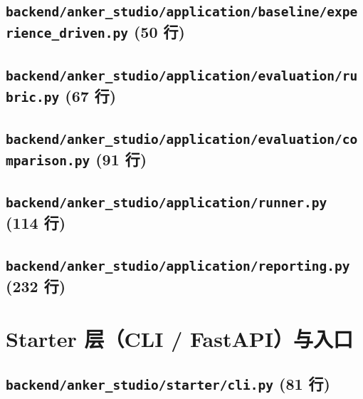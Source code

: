 \subsection*{\texttt{backend/anker\_studio/application/baseline/experience\_driven.py} \hfill \normalfont\small (50 行)}


\subsection*{\texttt{backend/anker\_studio/application/evaluation/rubric.py} \hfill \normalfont\small (67 行)}


\subsection*{\texttt{backend/anker\_studio/application/evaluation/comparison.py} \hfill \normalfont\small (91 行)}


\subsection*{\texttt{backend/anker\_studio/application/runner.py} \hfill \normalfont\small (114 行)}


\subsection*{\texttt{backend/anker\_studio/application/reporting.py} \hfill \normalfont\small (232 行)}


\section{Starter 层（CLI / FastAPI）与入口}
\subsection*{\texttt{backend/anker\_studio/starter/cli.py} \hfill \normalfont\small (81 行)}


